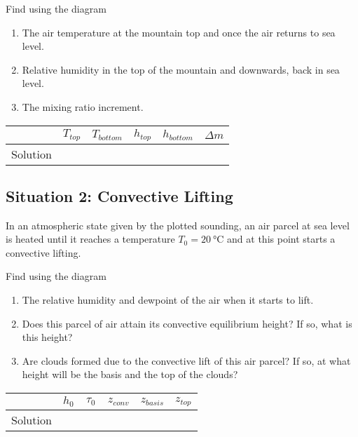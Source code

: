\documentclass{article}
\newcommand{\gc}{\degreeCelsius}
\begin{document}
Find using the diagram
\begin{enumerate}
\item The air temperature at the mountain top and once the air returns
  to sea level.
\item Relative humidity in the top of the mountain and downwards, back
  in sea level.
\item The mixing ratio increment.
\end{enumerate}

\vspace{0.25cm}
\begin{tabular}{c|c|c|c|c|c|}
 & $T_{top}$ & $T_{bottom}$  & $h_{top}$ & $h_{bottom}$  & $\Delta m$ \\
\hline
Solution &~\hspace{2cm}~&~\hspace{2cm}~&~\hspace{2cm}~&~\hspace{2cm}~&~\hspace{2cm}~\\
\hline
\end{tabular}
\subsection{Situation 2: Convective Lifting}
In an atmospheric state given by the plotted sounding, an air parcel
at sea level is heated until it reaches a temperature $T_0 =
\SI{20}{\gc}$ and at this point starts a convective lifting.

Find using the diagram
\begin{enumerate}
\item The relative humidity and dewpoint of the air when it starts to
  lift.
\item Does this parcel of air attain its convective equilibrium
  height? If so, what is this height?
\item Are clouds formed due to the convective lift of this air parcel?
  If so, at what height will be the basis and the top of the clouds? 
\end{enumerate}

\vspace{0.25cm}
\begin{tabular}{c|c|c|c|c|c|}
 & $h_{0}$ & $\tau_{0}$  & $z_{conv}$ & $z_{basis}$  & $z_{top}$ \\
\hline
Solution &~\hspace{2cm}~&~\hspace{2cm}~&~\hspace{2cm}~&~\hspace{2cm}~&~\hspace{2cm}~\\
\hline
\end{tabular}

\nocite{Stull2015}





\end{document}

